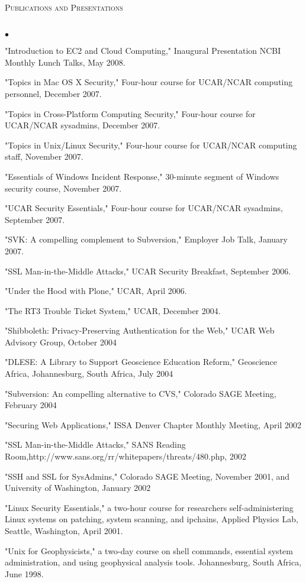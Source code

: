 \documentclass{article}
\newcommand{\lineunder}{\vspace*{-8pt} \\ \hspace*{-18pt} \hrulefill \\}
\newcommand{\header}[1]{{\hspace*{-15pt}\vspace*{6pt} \textsc{#1}} \vspace*{-6pt} \lineunder}
\newenvironment{achievements}{\begin{list}{$\bullet$}{\topsep 0pt \itemsep -2pt}}{\vspace*{4pt}\end{list}}
\begin{document}
\header{Publications and Presentations}
\begin{achievements}
\item "Introduction to EC2 and Cloud Computing," Inaugural Presentation NCBI Monthly Lunch Talks, May 2008.
\item "Topics in Mac OS X Security," Four-hour course for UCAR/NCAR computing personnel, December 2007.
\item "Topics in Cross-Platform Computing Security," Four-hour course for UCAR/NCAR sysadmins, December 2007.  
\item "Topics in Unix/Linux Security," Four-hour course for UCAR/NCAR computing staff, November 2007.
\item "Essentials of Windows Incident Response," 30-minute segment of Windows security course, November 2007.
\item "UCAR Security Essentials,"  Four-hour course for UCAR/NCAR sysadmins, September 2007.
\item "SVK: A compelling complement to Subversion," Employer Job Talk, January 2007.
\item "SSL Man-in-the-Middle Attacks," UCAR Security Breakfast, September 2006.
\item "Under the Hood with Plone," UCAR, April 2006.
\item "The RT3 Trouble Ticket System," UCAR, December 2004.  
\item "Shibboleth: Privacy-Preserving Authentication for the Web," UCAR Web Advisory Group, October 2004
\item "DLESE: A Library to Support Geoscience Education Reform," Geoscience Africa, Johannesburg, South Africa, July 2004
\item "Subversion: An compelling alternative to CVS," Colorado SAGE Meeting, February 2004
\item "Securing Web Applications," ISSA Denver Chapter Monthly Meeting, April 2002
\item "SSL Man-in-the-Middle Attacks," SANS Reading Room,http://www.sans.org/rr/whitepapers/threats/480.php, 2002
\item "SSH and SSL for SysAdmins," Colorado SAGE Meeting, November 2001, and University of Washington, January 2002
\item "Linux Security Essentials," a two-hour course for researchers self-administering Linux systems on patching, system scanning, and ipchains,  Applied Physics Lab, Seattle, Washington, April 2001.
\item "Unix for Geophysicists," a two-day course on shell commands, essential system administration, and using geophysical analysis tools.  Johannesburg, South Africa, June 1998.
\end{achievements}
\end{document}
